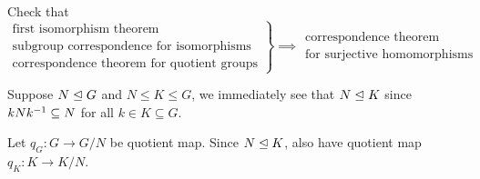 \begin{exercise}
Check that 
$$
\left.
\begin{array}{r}
\text{first isomorphism theorem}\\
\text{subgroup correspondence for isomorphisms}\\
\text{correspondence theorem for quotient groups}
\end{array}
\right\} \implies \begin{array}{l}
	\text{correspondence theorem}\\ \text{for surjective homomorphisms}
\end{array}
$$
\end{exercise}

Suppose $N\trianglelefteq G$ and $N\le K\le G$, we immediately see that $N\trianglelefteq K$ since $kNk^{-1} \subseteq N$ for all $k\in K \subseteq G$. 

Let $q_G:G\to G/N$ be quotient map. Since $N\trianglelefteq K$, also have quotient map $q_K:K\to K/N$.

